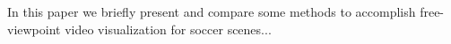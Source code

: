 In this paper we briefly present and compare some methods to accomplish free-viewpoint video 
visualization for soccer scenes... %


